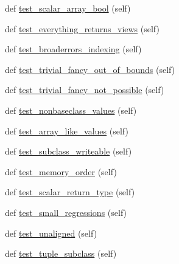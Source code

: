 \begin{DoxyCompactItemize}
\item 
def \hyperlink{classnumpy_1_1core_1_1tests_1_1test__indexing_1_1TestIndexing_a7f8c156a5c53e4548b49d5692672b86b}{test\+\_\+scalar\+\_\+array\+\_\+bool} (self)
\item 
def \hyperlink{classnumpy_1_1core_1_1tests_1_1test__indexing_1_1TestIndexing_a86a548bcc802edc2dcbba9cd1bff8421}{test\+\_\+everything\+\_\+returns\+\_\+views} (self)
\item 
def \hyperlink{classnumpy_1_1core_1_1tests_1_1test__indexing_1_1TestIndexing_abb223f0aecb25365ac882dbc6d4a602a}{test\+\_\+broaderrors\+\_\+indexing} (self)
\item 
def \hyperlink{classnumpy_1_1core_1_1tests_1_1test__indexing_1_1TestIndexing_ac5e3a7c4285a6069b09414e1e2b1ade3}{test\+\_\+trivial\+\_\+fancy\+\_\+out\+\_\+of\+\_\+bounds} (self)
\item 
def \hyperlink{classnumpy_1_1core_1_1tests_1_1test__indexing_1_1TestIndexing_aae9da4e3ff0a90214b8070bfe56ae8e2}{test\+\_\+trivial\+\_\+fancy\+\_\+not\+\_\+possible} (self)
\item 
def \hyperlink{classnumpy_1_1core_1_1tests_1_1test__indexing_1_1TestIndexing_ac0b6d20d6d53fc38caf46dab3bab690e}{test\+\_\+nonbaseclass\+\_\+values} (self)
\item 
def \hyperlink{classnumpy_1_1core_1_1tests_1_1test__indexing_1_1TestIndexing_a86461ab8b1f9eb6dcb69da70847cc317}{test\+\_\+array\+\_\+like\+\_\+values} (self)
\item 
def \hyperlink{classnumpy_1_1core_1_1tests_1_1test__indexing_1_1TestIndexing_ae03f6ee1ebc0d8f3213dac9442d6337c}{test\+\_\+subclass\+\_\+writeable} (self)
\item 
def \hyperlink{classnumpy_1_1core_1_1tests_1_1test__indexing_1_1TestIndexing_ab1c4905e5809df638f2220ef3bdb7dcc}{test\+\_\+memory\+\_\+order} (self)
\item 
def \hyperlink{classnumpy_1_1core_1_1tests_1_1test__indexing_1_1TestIndexing_ae55cf656dc321bc9630118ddabdb251c}{test\+\_\+scalar\+\_\+return\+\_\+type} (self)
\item 
def \hyperlink{classnumpy_1_1core_1_1tests_1_1test__indexing_1_1TestIndexing_a073ea07ee6481023ec90407c00a4b730}{test\+\_\+small\+\_\+regressions} (self)
\item 
def \hyperlink{classnumpy_1_1core_1_1tests_1_1test__indexing_1_1TestIndexing_a63cb19aa5f696f56a91d00371c3feb04}{test\+\_\+unaligned} (self)
\item 
def \hyperlink{classnumpy_1_1core_1_1tests_1_1test__indexing_1_1TestIndexing_a1df1d0e508ea2917f658bd83692e33f4}{test\+\_\+tuple\+\_\+subclass} (self)

\end{DoxyCompactItemize}
